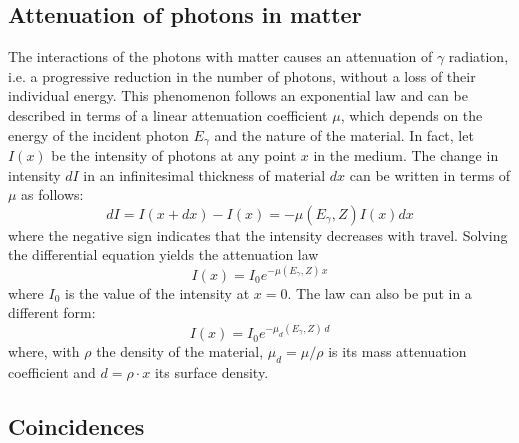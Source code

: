 \subsection{Attenuation of photons in matter}
\label{sec:attenuation}

The interactions of the photons with matter causes an attenuation of $\gamma$ radiation, i.e. a progressive reduction in the number of photons, without a loss of their individual energy.
This phenomenon follows an exponential law and can be described in terms of a linear attenuation coefficient $\mu$, which depends on the energy of the incident photon $E_{\gamma}$ and the nature of the material.
In fact, let $I(x)$ be the intensity of photons at any point $x$ in the medium.
The change in intensity $dI$ in an infinitesimal thickness of material $dx$ can be written in terms of $\mu$ as follows:
\begin{equation}
    dI = I(x + dx) - I(x) = -\mu(E_{\gamma}, Z) I(x) dx
\end{equation}
where the negative sign indicates that the intensity decreases with travel.
Solving the differential equation yields the attenuation law
\begin{equation} \label{eq:attenuation_law}
    I(x) = I_0 e^{-\mu(E_{\gamma}, Z) \, x}
\end{equation}
where $I_0$ is the value of the intensity at $x=0$. 
The law can also be put in a different form:
\begin{equation} \label{eq:attenuation_law_density}
    I(x) = I_0 e^{-\mu_d(E_{\gamma}, Z) \, d}
\end{equation}
where, with $\rho$ the density of the material, $\mu_d = \mu / \rho$ is its mass attenuation coefficient and $d = \rho \cdot x$ its surface density.

\subsection{Coincidences}
\label{sec:coincidences}

